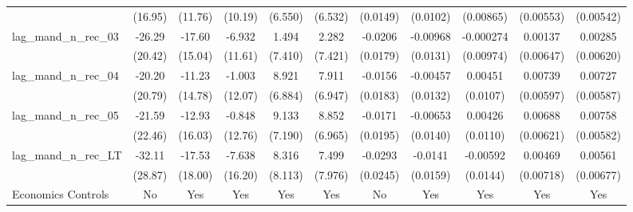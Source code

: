 {\begin{longtable}{l*{10}{c}}
                    &     (16.95)         &     (11.76)         &     (10.19)         &     (6.550)         &     (6.532)         &    (0.0149)         &    (0.0102)         &   (0.00865)         &   (0.00553)         &   (0.00542)         \\
[1em]
lag\_mand\_n\_rec\_03   &      -26.29         &      -17.60         &      -6.932         &       1.494         &       2.282         &     -0.0206         &    -0.00968         &   -0.000274         &     0.00137         &     0.00285         \\
                    &     (20.42)         &     (15.04)         &     (11.61)         &     (7.410)         &     (7.421)         &    (0.0179)         &    (0.0131)         &   (0.00974)         &   (0.00647)         &   (0.00620)         \\
[1em]
lag\_mand\_n\_rec\_04   &      -20.20         &      -11.23         &      -1.003         &       8.921         &       7.911         &     -0.0156         &    -0.00457         &     0.00451         &     0.00739         &     0.00727         \\
                    &     (20.79)         &     (14.78)         &     (12.07)         &     (6.884)         &     (6.947)         &    (0.0183)         &    (0.0132)         &    (0.0107)         &   (0.00597)         &   (0.00587)         \\
[1em]
lag\_mand\_n\_rec\_05   &      -21.59         &      -12.93         &      -0.848         &       9.133         &       8.852         &     -0.0171         &    -0.00653         &     0.00426         &     0.00688         &     0.00758         \\
                    &     (22.46)         &     (16.03)         &     (12.76)         &     (7.190)         &     (6.965)         &    (0.0195)         &    (0.0140)         &    (0.0110)         &   (0.00621)         &   (0.00582)         \\
[1em]
lag\_mand\_n\_rec\_LT   &      -32.11         &      -17.53         &      -7.638         &       8.316         &       7.499         &     -0.0293         &     -0.0141         &    -0.00592         &     0.00469         &     0.00561         \\
                    &     (28.87)         &     (18.00)         &     (16.20)         &     (8.113)         &     (7.976)         &    (0.0245)         &    (0.0159)         &    (0.0144)         &   (0.00718)         &   (0.00677)         \\
[1em]
Economics Controls  &          No         &         Yes         &         Yes         &         Yes         &         Yes         &          No         &         Yes         &         Yes         &         Yes         &         Yes         \\

\end{longtable}}
